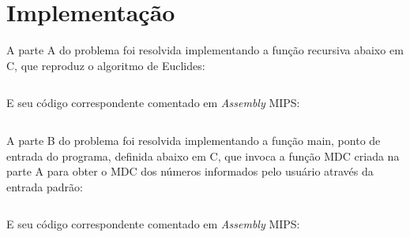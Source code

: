 \chapter{Implementação}

A parte A do problema foi resolvida implementando a função recursiva abaixo em C, que reproduz o algoritmo de Euclides:\\

\inputminted[frame=lines, framesep=2mm, baselinestretch=1.2, linenos, tabsize=4, 
fontsize=\small]{c}{./documentos/euclides.c} 

E seu código correspondente comentado em \textit{Assembly} MIPS:\\

\inputminted[frame=lines, framesep=2mm, baselinestretch=1.2, linenos, tabsize=4, breaklines,
fontsize=\small]{asm}{./documentos/euclides.asm}

    A parte B do problema foi resolvida implementando a função main, ponto de entrada do programa, definida abaixo em C, que invoca a função MDC criada na parte A para obter o MDC dos números informados pelo usuário através da entrada padrão:\\

\inputminted[frame=lines, framesep=2mm, baselinestretch=1.2, linenos, tabsize=4, fontsize=\small]{c}{./documentos/main.c}

E seu código correspondente comentado em \textit{Assembly} MIPS:\\

\inputminted[frame=lines, framesep=2mm, baselinestretch=1.2, linenos, tabsize=4, breaklines, fontsize=\small]{asm}{./documentos/main.asm}